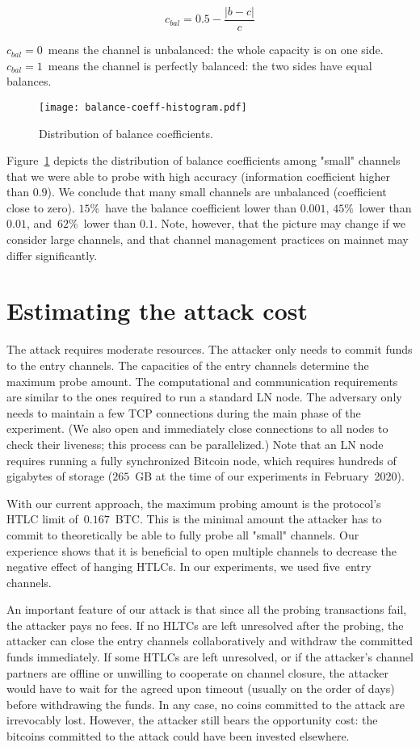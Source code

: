 \[c_{bal} = 0.5 - \frac{|b-c|}{c} \]

$c_{bal} = 0$~means the channel is unbalanced: the whole capacity is on one side.
$c_{bal} = 1$~means the channel is perfectly balanced: the two sides have equal balances.

\begin{figure}[h]
	\centering
	\texttt{[image: balance-coeff-histogram.pdf]}
	\caption{Distribution of balance coefficients.}
	\label{fig:balance-coeff-histogram}
\end{figure}

Figure~\ref{fig:balance-coeff-histogram} depicts the distribution of balance coefficients among "small" channels that we were able to probe with high accuracy (information coefficient higher than $0.9$).
We conclude that many small channels are unbalanced (coefficient close to zero).
$15\%$~have the balance coefficient lower than $0.001$, $45\%$~lower than $0.01$, and~$62\%$~lower than $0.1$.
Note, however, that the picture may change if we consider large channels, and that channel management practices on mainnet may differ significantly.


\section{Estimating the attack cost}

The attack requires moderate resources.
The attacker only needs to commit funds to the entry channels.
The capacities of the entry channels determine the maximum probe amount.
The computational and communication requirements are similar to the ones required to run a standard LN node.
The adversary only needs to maintain a few TCP connections during the main phase of the experiment.
(We also open and immediately close connections to all nodes to check their liveness; this process can be parallelized.)
Note that an LN node requires running a fully synchronized Bitcoin node, which requires hundreds of gigabytes of storage ($265$~GB at the time of our experiments in February~2020).

With our current approach, the maximum probing amount is the protocol's HTLC limit of~$0.167$~BTC\@.
This is the minimal amount the attacker has to commit to theoretically be able to fully probe all "small" channels.
Our experience shows that it is beneficial to open multiple channels to decrease the negative effect of hanging HTLCs.
In our experiments, we used five~entry channels.

An important feature of our attack is that since all the probing transactions fail, the attacker pays no fees.
If no HLTCs are left unresolved after the probing, the attacker can close the entry channels collaboratively and withdraw the committed funds immediately.
If some HTLCs are left unresolved, or if the attacker's channel partners are offline or unwilling to cooperate on channel closure, the attacker would have to wait for the agreed upon timeout (usually on the order of days) before withdrawing the funds.
In any case, no coins committed to the attack are irrevocably lost.
However, the attacker still bears the opportunity cost: the bitcoins committed to the attack could have been invested elsewhere.


